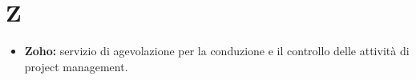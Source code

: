 \section{Z}
\begin{itemize}
	\item \textbf{Zoho:} servizio di agevolazione per la conduzione e il controllo delle attività di project management.
\end{itemize}
  
